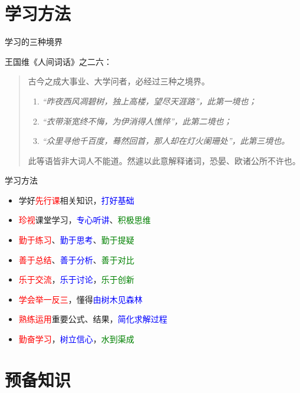\documentclass[fontset=windows, chinese, 10pt]{beamer}
\newcommand{\red}[1]{\textcolor{red}{#1}}
\newcommand{\blue}[1]{\textcolor{blue}{#1}}
\newcommand{\green}[1]{\textcolor{green}{#1}}
\begin{document}
\section{学习方法}
\begin{frame}{学习的三种境界}

  王国维《人间词话》之二六：
  \begin{quote}
    古今之成大事业、大学问者，必经过三种之境界。
    \begin{enumerate}
      \item \textit{“昨夜西风凋碧树，独上高楼，望尽天涯路”，此第一境也；}
      \item \textit{“衣带渐宽终不悔，为伊消得人憔悴”，此第二境也；}
      \item \textit{“众里寻他千百度，蓦然回首，那人却在灯火阑珊处”，此第三境也。}
    \end{enumerate}
    此等语皆非大词人不能道。然遽以此意解释诸词，恐晏、欧诸公所不许也。
  \end{quote}

  \end{frame}

\begin{frame}{学习方法}

\begin{itemize}
  \item 学好\red{先行课}相关知识，\blue{打好基础}
  \item \red{珍视}课堂学习，\blue{专心听讲}、\green{积极思维}
  \item \red{勤于练习}、\blue{勤于思考}、\green{勤于提疑}
  \item \red{善于总结}、\blue{善于分析}、\green{善于对比}
  \item \red{乐于交流}，\blue{乐于讨论}，\green{乐于创新}
  \item \red{学会举一反三}，懂得\blue{由树木见森林}
  \item \red{熟练运用}重要公式、结果，\blue{简化求解过程}
  \item \red{勤奋学习}，\blue{树立信心}，\green{水到渠成}
\end{itemize}
\end{frame}

\section{预备知识}


  
\end{document}
